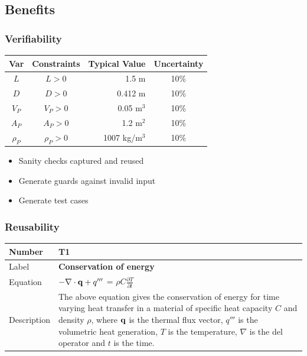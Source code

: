 \documentclass{beamer}
\newcommand{\colAwidth}{0.2\textwidth}
\newcommand{\colBwidth}{0.73\textwidth}
\begin{document}

\subsection[Benefits]{Benefits}


\begin{frame}

\frametitle{Verifiability}

\begin{table} 
\centering
\begin{tabular}{c c r c } 
\toprule
\textbf{Var} & \textbf{Constraints} & \textbf{Typical Value} & \textbf{Uncertainty}\\ \midrule
$L$ & $L > 0$ & 1.5 m & 10\% \\ 
$D$ & $D > 0$ & 0.412 m & 10\% \\ 
$V_P$ & $V_P > 0$ & 0.05 m$^3$	& 10\% \\
$A_P$ & $A_P > 0$ & 1.2 m$^2$	& 10\% \\
$\rho_P$ & $\rho_P > 0$	& 1007 kg/m$^3$	& 10\% \\
\bottomrule
\end{tabular}
\label{tab:pcm}
\end{table}

\begin{itemize}
\item Sanity checks captured and reused
\item Generate guards against invalid input
\item Generate test cases
\end{itemize}
\end{frame}


\begin{frame}

\frametitle{Reusability}

 \noindent
\begin{minipage}{\columnwidth}
\begin{tabular}{@{} p{\colAwidth}  p{\colBwidth}@{}}
\toprule
\textbf{Number}& \textbf{T1} \\
\midrule
Label&\bf Conservation of energy\\
\midrule
Equation&  $-{\bf \nabla \cdot q} +q'''$ = $\rho C \frac{\partial T}{\partial t}$ \smallskip\\
\midrule
Description & The above equation gives the conservation of energy for time 
varying heat transfer in a material of specific heat capacity $C$ and density $\rho$,
where $\bf q$ is the thermal flux vector, $q'''$ is the volumetric heat
generation, $T$ is the temperature, $\nabla$ is the del operator and $t$ is the time.\\
\bottomrule
\end{tabular}
\end{minipage}

\end{frame}
\end{document}
